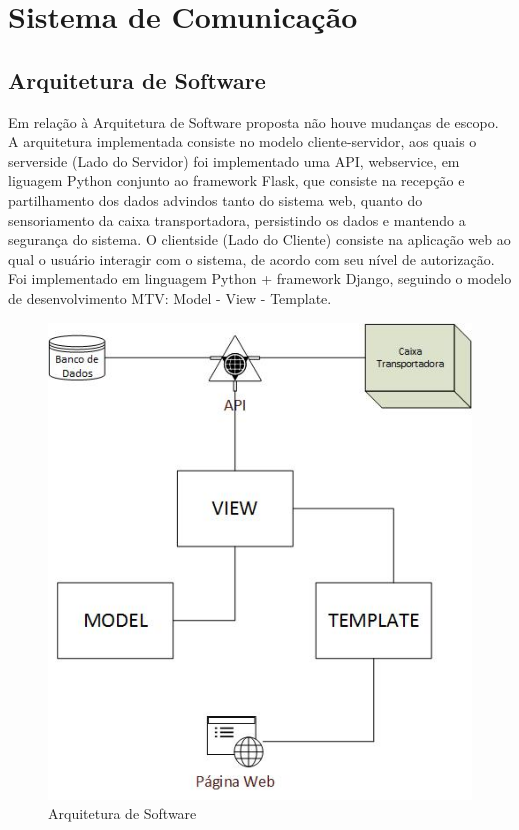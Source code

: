 \section{Sistema de Comunicação}
	
			\subsection{Arquitetura de Software}
			Em relação à Arquitetura de Software proposta não houve mudanças de escopo. 
			A arquitetura implementada consiste no modelo cliente-servidor, aos quais o serverside (Lado do Servidor) foi implementado uma API, webservice, em liguagem Python conjunto ao framework Flask, que consiste na recepção e partilhamento dos dados advindos tanto do sistema web, quanto do sensoriamento da caixa transportadora, persistindo os dados e mantendo a segurança do sistema. O clientside (Lado do Cliente) consiste na aplicação web ao qual o usuário interagir com o sistema, de acordo com seu nível de autorização. Foi implementado em linguagem Python + framework Django, seguindo o modelo de desenvolvimento MTV: Model - View - Template.

\begin{figure}[H]
	\centering
	\includegraphics[width=16cm]{figuras/arquitetura_software.jpg}
	\caption{Arquitetura de Software}
\end{figure}
